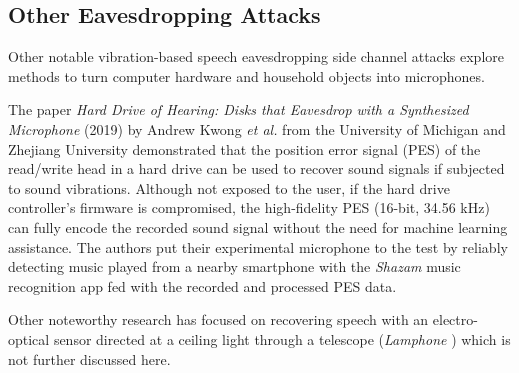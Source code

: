 \documentclass[sigconf, nonacm]{acmart}
\begin{document}
\subsection{Other Eavesdropping Attacks}

Other notable vibration-based speech eavesdropping side channel attacks explore methods to turn computer hardware and household objects into microphones.

The paper \textit{Hard Drive of Hearing: Disks that Eavesdrop with a Synthesized Microphone} (2019) \cite{HardDriveOfHearing2019} by Andrew Kwong \textit{et al.} from the University of Michigan and Zhejiang University demonstrated that the position error signal (PES) of the read/write head in a hard drive can be used to recover sound signals if subjected to sound vibrations.
Although not exposed to the user, if the hard drive controller's firmware is compromised, the high-fidelity PES (16-bit, 34.56 kHz) can fully encode the recorded sound signal without the need for machine learning assistance. The authors put their experimental microphone to the test by reliably detecting music played from a nearby smartphone with the \textit{Shazam} music recognition app fed with the recorded and processed PES data.

Other noteworthy research has focused on recovering speech with an electro-optical sensor directed at a ceiling light through a telescope (\textit{Lamphone} \cite{Lamphone2022}) which is not further discussed here.
\end{document}
